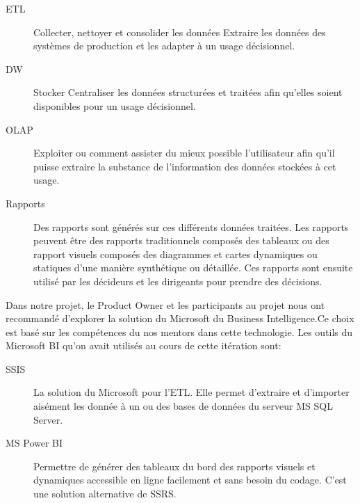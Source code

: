 \begin{description}
    \item [\acrfull{ETL}] Collecter, nettoyer et consolider les données
        Extraire les données des systèmes de production et les adapter à un
        usage décisionnel.
    \item [\acrfull{DW}] Stocker Centraliser les données structurées et
        traitées afin qu'elles soient disponibles pour un usage décisionnel.
    \item [\acrfull{OLAP}] Exploiter ou comment assister du mieux possible
        l'utilisateur afin qu'il puisse extraire la substance de l'information
        des données stockées à cet usage.
    \item [Rapports] Des rapports sont générés sur ces différents données
        traitées. Les rapports peuvent être des rapports traditionnels composés
        des tableaux ou des rapport visuels composés des diagrammes et cartes
        dynamiques ou statiques d'une manière synthétique ou détaillée. Ces
        rapports sont ensuite utilisé par les décideurs et les dirigeants pour
        prendre des décisions.
\end{description}

Dans notre projet, le Product Owner et les participants au projet nous ont
recommandé d'explorer la solution du Microsoft du Business Intelligence.Ce choix est basé sur les compétences du
nos mentors dans cette technologie. Les outils du Microsoft BI qu'on avait
utilisés au cours de cette itération sont:

\begin{description}
    \item [\acrfull{SSIS}] La solution du Microsoft pour l'\acrshort{ETL}. Elle
        permet d'extraire et d'importer aisément les donnée à un ou des bases
        de données du serveur MS SQL Server.
    \item [MS Power BI] Permettre de générer des tableaux du bord des rapports
        visuels et dynamiques accessible en ligne facilement et sans besoin du
        codage. C'est une solution alternative de \acrfull{SSRS}.
\end{description}


